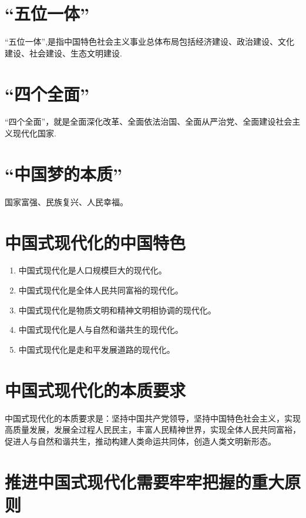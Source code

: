 \documentclass[12pt, a4paper, oneside]{ctexbook}
\begin{document}
\section{“五位一体”}

“五位一体”,是指中国特色社会主义事业总体布局包括经济建设、政治建设、文化建设、社会建设、生态文明建设.

\section{“四个全面”}

“四个全面”，就是全面深化改革、全面依法治国、全面从严治党、全面建设社会主义现代化国家.

\section{“中国梦的本质”}

国家富强、民族复兴、人民幸福。

\section{中国式现代化的中国特色}

\begin{enumerate}
\item 中国式现代化是人口规模巨大的现代化。

\item 中国式现代化是全体人民共同富裕的现代化。

\item 中国式现代化是物质文明和精神文明相协调的现代化。

\item 中国式现代化是人与自然和谐共生的现代化。

\item 中国式现代化是走和平发展道路的现代化。
\end{enumerate}

\section{中国式现代化的本质要求}

中国式现代化的本质要求是：坚持中国共产党领导，坚持中国特色社会主义，实现高质量发展，发展全过程人民民主，丰富人民精神世界，实现全体人民共同富裕，促进人与自然和谐共生，推动构建人类命运共同体，创造人类文明新形态。

\section{推进中国式现代化需要牢牢把握的重大原则}
\end{document}
